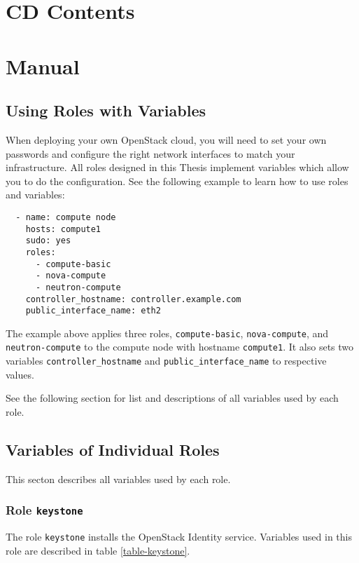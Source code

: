 \chapter{CD Contents}


\chapter{Manual}

\section{Using Roles with Variables}

When deploying your own OpenStack cloud, you will need to set your own passwords and configure the right network interfaces to match your infrastructure. All roles designed in this Thesis implement variables which allow you to do the configuration. See the following example to learn how to use roles and variables:

\begin{lstlisting}
  - name: compute node
    hosts: compute1
    sudo: yes
    roles:
      - compute-basic
      - nova-compute
      - neutron-compute
    controller_hostname: controller.example.com
    public_interface_name: eth2
\end{lstlisting}

The example above applies three roles, \texttt{compute-basic}, \texttt{nova-compute}, and \texttt{neutron-compute} to the compute node with hostname \texttt{compute1}. It also sets two variables \texttt{controller\_hostname} and \texttt{public\_interface\_name} to respective values.

See the following section for list and descriptions of all variables used by each role.

\clearpage

\section{Variables of Individual Roles}

This secton describes all variables used by each role.

\subsection{Role \texttt{keystone}}

The role \texttt{keystone} installs the OpenStack Identity service. Variables used in this role are described in table \ref{table-keystone}.

